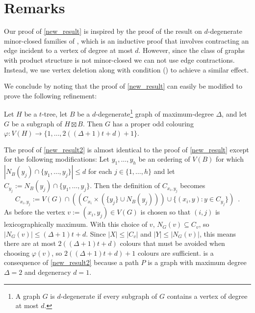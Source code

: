 \documentclass{patmorin}
\begin{document}
\section{Remarks}

Our proof of \cref{new_result} is inspired by the proof of the result on $d$-degenerate minor-closed families of \citet{cranston.lafferty.ea:note}, which is an inductive proof that involves contracting an edge incident to a vertex of degree at most $d$.  However, since the class of graphs with product structure is not minor-closed we can not use edge contractions. Instead, we use vertex deletion along with condition () to achieve a similar effect.

We conclude by noting that the proof of \cref{new_result} can easily be modified to prove the following refinement:

\begin{thm}\label{new_result2}
  Let $H$ be a $t$-tree, let $B$ be a $d$-degenerate\footnote{A graph $G$ is $d$-degenerate if every subgraph of $G$ contains a vertex of degree at most $d$.} graph of maximum-degree $\Delta$, and let $G$ be a subgraph of $H\boxtimes B$. Then $G$ has a proper odd colouring $\varphi:V(H)\to\{1,\ldots,2((\Delta+1)t + d)+1\}$.
\end{thm}

The proof of \cref{new_result2} is almost identical to the proof of \cref{new_result} except for the following modifications:  Let $y_1,\ldots,y_h$ be an ordering of $V(B)$ for which $|N_B(y_j)\cap\{y_1,\ldots,y_{j}\}|\le d$ for each $j\in\{1,\ldots,h\}$ and let $C_{y_j}:=N_B(y_j)\cap\{y_1,\ldots,y_{j}\}$.  Then the definition of $C_{x_i,y_j}$ becomes
\[
   C_{x_i,y_j} := V(G)\cap \left( (C_{x_i}\times (\{y_j\}\cup N_B(y_j)))
       \cup \{(x_i,y): y \in C_{y_j}\}  \right) \enspace .
\]
As before the vertex $v:=(x_i,y_j)\in V(G)$ is chosen so that $(i,j)$ is lexicographically maximum.  With this choice of $v$,  $N_G(v)\subseteq C_v$, so $|N_G(v)|\le (\Delta+1)t+d$. Since $|X|\le |C_v|$ and $|Y|\le |N_G(v)|$, this means there are at most $2((\Delta+1)t+d)$ colours that must be avoided when choosing $\varphi(v)$, so $2((\Delta+1)t+d)+1$ colours are sufficient.  is a consequence of \cref{new_result2} because a path $P$ is a graph with maximum degree $\Delta=2$ and degeneracy $d=1$.



\end{document}
